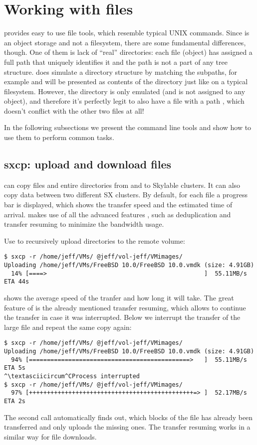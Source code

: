 \section{Working with files} \label{sec:files}
\SX provides easy to use file tools, which resemble typical UNIX commands.
Since \SX is an object storage and not a filesystem, there are some
fundamental differences, though. One of them is lack of ``real'' directories:
each file (object) has assigned a full path that uniquely identifies it and
the path is not a part of any tree structure. \SX does simulate a directory
structure by matching the subpaths, for example 
and  will be presented as contents of the directory
 just like on a typical filesystem. However, the directory
 is only emulated (and is not assigned to any object), and
therefore it's perfectly legit to also have a file with a path ,
which doesn't conflict with the other two files at all! 

In the following subsections we present the command line tools and show
how to use them to perform common tasks.

\subsection{sxcp: upload and download files}
 can copy files and entire directories from and to Skylable \SX
clusters. It can also copy data between two different SX clusters. By default,
for each file a progress bar is displayed, which shows the transfer speed and
the estimated time of arrival.  makes use of all the advanced features \SX,
such as deduplication and transfer resuming to minimize the bandwidth usage.

Use  to recursively upload directories to the remote volume:
\begin{lstlisting}
$ sxcp -r /home/jeff/VMs/ @jeff/vol-jeff/VMimages/
Uploading /home/jeff/VMs/FreeBSD 10.0/FreeBSD 10.0.vmdk (size: 4.91GB)
  14% [====>                                            ]  55.11MB/s ETA 44s
\end{lstlisting}
 shows the average speed of the tranfer and how long it will take.
The great feature of \SX is the already mentioned transfer resuming, which
allows to continue the transfer in case it was interrupted. Below we interrupt
the transfer of the large file and repeat the same copy again:
\begin{lstlisting}
$ sxcp -r /home/jeff/VMs/ @jeff/vol-jeff/VMimages/
Uploading /home/jeff/VMs/FreeBSD 10.0/FreeBSD 10.0.vmdk (size: 4.91GB)
  94% [=============================================>   ]  55.11MB/s ETA 5s
^\textasciicircum^CProcess interrupted
$ sxcp -r /home/jeff/VMs/ @jeff/vol-jeff/VMimages/
  97% [++++++++++++++++++++++++++++++++++++++++++++++=> ]  52.17MB/s ETA 2s
\end{lstlisting}
The second  call automatically finds out, which blocks of the file
has already been transferred and only uploads the missing ones. The transfer
resuming works in a similar way for file downloads.


